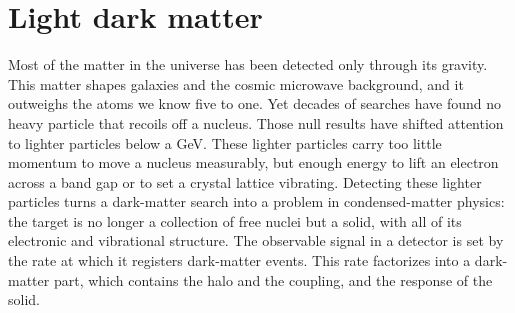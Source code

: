 \chapter{Light dark matter}\label{chap:1}

Most of the matter in the universe has been detected only through its gravity. This matter shapes galaxies and the cosmic microwave background, and it outweighs the atoms we know five to one. Yet decades of searches have found no heavy particle that recoils off a nucleus. Those null results have shifted attention to lighter particles below a GeV. These lighter particles carry too little momentum to move a nucleus measurably, but enough energy to lift an electron across a band gap or to set a crystal lattice vibrating. Detecting these lighter particles turns a dark-matter search into a problem in condensed-matter physics: the target is no longer a collection of free nuclei but a solid, with all of its electronic and vibrational structure. The observable signal in a detector is set by the rate at which it registers dark-matter events. This rate factorizes into a dark-matter part, which contains the halo and the coupling, and the response of the solid.






\printbibliography[heading=subbibliography]
